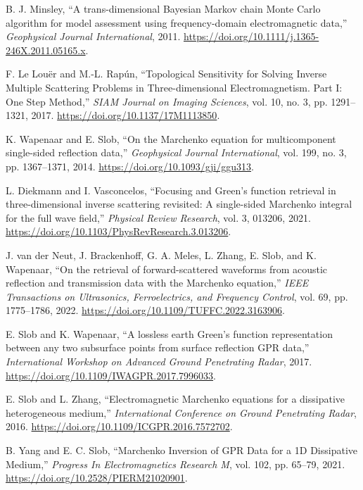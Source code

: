  B. J. Minsley, ``A trans-dimensional Bayesian Markov chain Monte Carlo algorithm for model assessment using frequency-domain electromagnetic data,'' \emph{Geophysical Journal International}, 2011. \url{https://doi.org/10.1111/j.1365-246X.2011.05165.x}.

 F. Le Louër and M.-L. Rapún, ``Topological Sensitivity for Solving Inverse Multiple Scattering Problems in Three-dimensional Electromagnetism. Part I: One Step Method,'' \emph{SIAM Journal on Imaging Sciences}, vol. 10, no. 3, pp. 1291--1321, 2017. \url{https://doi.org/10.1137/17M1113850}.

 K. Wapenaar and E. Slob, ``On the Marchenko equation for multicomponent single-sided reflection data,'' \emph{Geophysical Journal International}, vol. 199, no. 3, pp. 1367--1371, 2014. \url{https://doi.org/10.1093/gji/ggu313}.

 L. Diekmann and I. Vasconcelos, ``Focusing and Green's function retrieval in three-dimensional inverse scattering revisited: A single-sided Marchenko integral for the full wave field,'' \emph{Physical Review Research}, vol. 3, 013206, 2021. \url{https://doi.org/10.1103/PhysRevResearch.3.013206}.

 J. van der Neut, J. Brackenhoff, G. A. Meles, L. Zhang, E. Slob, and K. Wapenaar, ``On the retrieval of forward-scattered waveforms from acoustic reflection and transmission data with the Marchenko equation,'' \emph{IEEE Transactions on Ultrasonics, Ferroelectrics, and Frequency Control}, vol. 69, pp. 1775--1786, 2022. \url{https://doi.org/10.1109/TUFFC.2022.3163906}.

 E. Slob and K. Wapenaar, ``A lossless earth Green's function representation between any two subsurface points from surface reflection GPR data,'' \emph{International Workshop on Advanced Ground Penetrating Radar}, 2017. \url{https://doi.org/10.1109/IWAGPR.2017.7996033}.

 E. Slob and L. Zhang, ``Electromagnetic Marchenko equations for a dissipative heterogeneous medium,'' \emph{International Conference on Ground Penetrating Radar}, 2016. \url{https://doi.org/10.1109/ICGPR.2016.7572702}.

 B. Yang and E. C. Slob, ``Marchenko Inversion of GPR Data for a 1D Dissipative Medium,'' \emph{Progress In Electromagnetics Research M}, vol. 102, pp. 65--79, 2021. \url{https://doi.org/10.2528/PIERM21020901}.

